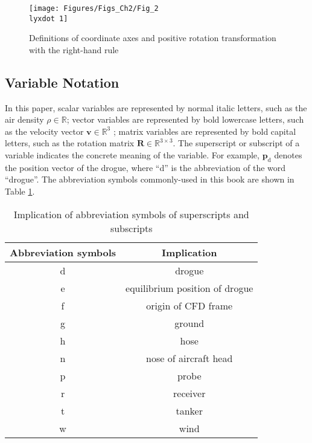\begin{figure}
	\begin{centering}
		\texttt{[image: Figures/Figs\_Ch2/Fig\_2\\lyxdot 1]}
		\par\end{centering}
	\caption{Definitions of coordinate axes and positive rotation transformation
		with the right-hand rule}
	
	\centering{}\label{Fig_2.1}
\end{figure}


\subsection{Variable Notation}

In this paper, scalar variables are represented by normal italic letters,
such as the air density $\rho\in\mathbb{R}$; vector variables are
represented by bold lowercase letters, such as the velocity vector
$\mathbf{v}\in{{\mathbb{R}}^{3}}$ ; matrix variables are represented
by bold capital letters, such as the rotation matrix $\mathbf{R}\in{{\mathbb{R}}^{3\times3}}$.
The superscript or subscript of a variable indicates the concrete
meaning of the variable. For example, ${{\mathbf{p}}_{\text{d}}}$
denotes the position vector of the drogue, where \textquotedblleft d\textquotedblright{}
is the abbreviation of the word \textquotedblleft drogue\textquotedblright .
The abbreviation symbols commonly-used in this book are shown in Table
\ref{Tab_2.1}.

\begin{table}
	\caption{Implication of abbreviation symbols of superscripts and subscripts}
	
	\begin{centering}
		\begin{tabular}{|c|c|}
			\hline 
			Abbreviation symbols & Implication\tabularnewline
			\hline 
			d & drogue\tabularnewline
			\hline 
			e & equilibrium position of drogue\tabularnewline
			\hline 
			f & origin of CFD frame\tabularnewline
			\hline 
			g & ground\tabularnewline
			\hline 
			h & hose\tabularnewline
			\hline 
			n & nose of aircraft head\tabularnewline
			\hline 
			p & probe\tabularnewline
			\hline 
			r & receiver\tabularnewline
			\hline 
			t & tanker\tabularnewline
			\hline 
			w & wind\tabularnewline
			\hline 
		\end{tabular}
		\par\end{centering}
	\centering{}\label{Tab_2.1}
\end{table}

